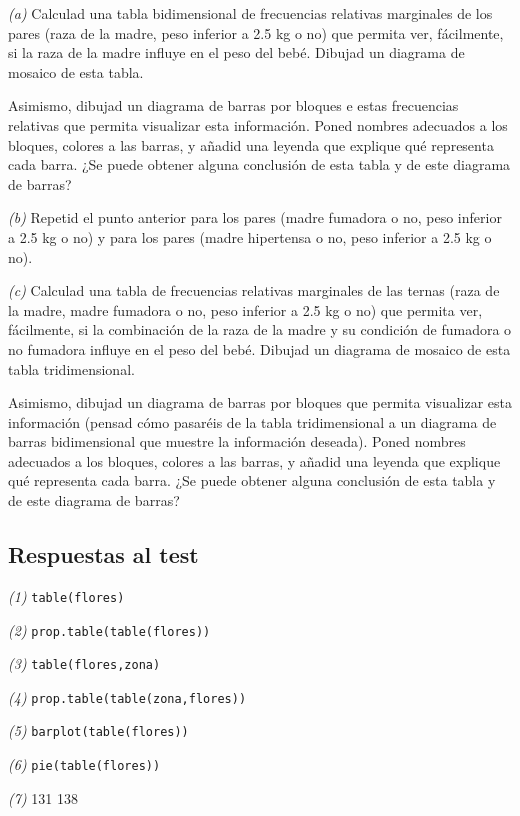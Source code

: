 \documentclass[
]{book}
\theoremstyle{definition}
\theoremstyle{definition}
\theoremstyle{definition}
\theoremstyle{remark}
\begin{document}
\emph{(a)} Calculad una tabla bidimensional de frecuencias relativas marginales de los pares (raza de la madre, peso inferior a 2.5 kg o no) que permita ver, fácilmente, si la raza de la madre influye en el peso del bebé. Dibujad un diagrama de mosaico de esta tabla.

Asimismo, dibujad un diagrama de barras por bloques e estas frecuencias relativas que permita visualizar esta información. Poned nombres adecuados a los bloques, colores a las barras, y añadid una leyenda que explique qué representa cada barra. ¿Se puede obtener alguna conclusión de esta tabla y de este diagrama de barras?

\emph{(b)} Repetid el punto anterior para los pares (madre fumadora o no, peso inferior a 2.5 kg o no) y para los pares (madre hipertensa o no, peso inferior a 2.5 kg o no).

\emph{(c)} Calculad una tabla de frecuencias relativas marginales de las ternas (raza de la madre, madre fumadora o no, peso inferior a 2.5 kg o no) que permita ver, fácilmente, si la combinación de la raza de la madre y su condición de fumadora o no fumadora influye en el peso del bebé. Dibujad un diagrama de mosaico de esta tabla tridimensional.

Asimismo, dibujad un diagrama de barras por bloques que permita visualizar esta información (pensad cómo pasaréis de la tabla tridimensional a un diagrama de barras bidimensional que muestre la información deseada). Poned nombres adecuados a los bloques, colores a las barras, y añadid una leyenda que explique qué representa cada barra. ¿Se puede obtener alguna conclusión de esta tabla y de este diagrama de barras?

\hypertarget{respuestas-al-test-7}{%
\subsection*{Respuestas al test}\label{respuestas-al-test-7}}

\emph{(1)} \texttt{table(flores)}

\emph{(2)} \texttt{prop.table(table(flores))}

\emph{(3)} \texttt{table(flores,zona)}

\emph{(4)} \texttt{prop.table(table(zona,flores))}

\emph{(5)} \texttt{barplot(table(flores))}

\emph{(6)} \texttt{pie(table(flores))}

\emph{(7)} 131 138
\end{document}
